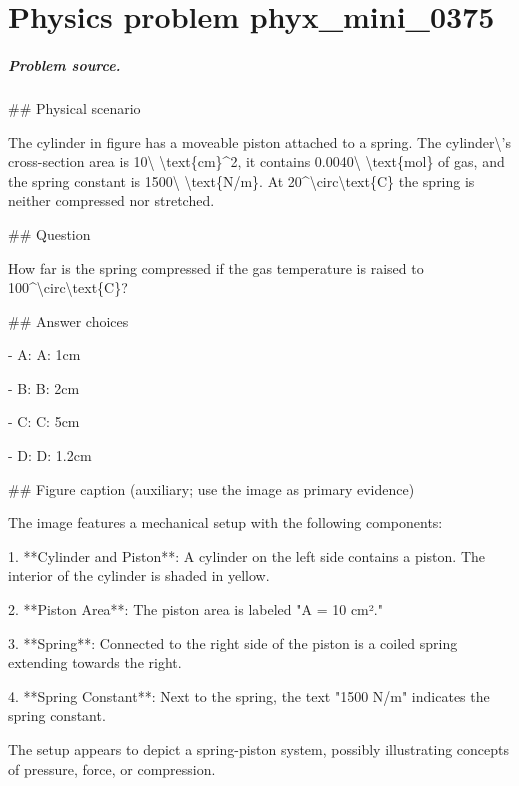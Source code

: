 
\chapter{Physics problem phyx\_mini\_0375}
\label{ch:PhyXMiniProblems_problem_phyx_mini_0375}

\paragraph{Problem source.}
\#\# Physical scenario

The cylinder in figure has a moveable piston attached to a spring. The cylinder\textbackslash{}'s cross-section area is 10\textbackslash{} \textbackslash{}text\{cm\}\textasciicircum{}2, it contains 0.0040\textbackslash{} \textbackslash{}text\{mol\} of gas, and the spring constant is 1500\textbackslash{} \textbackslash{}text\{N/m\}. At 20\textasciicircum{}\textbackslash{}circ\textbackslash{}text\{C\} the spring is neither compressed nor stretched.

\#\# Question

How far is the spring compressed if the gas temperature is raised to 100\textasciicircum{}\textbackslash{}circ\textbackslash{}text\{C\}?

\#\# Answer choices

- A: A: 1cm

- B: B: 2cm

- C: C: 5cm

- D: D: 1.2cm

\#\# Figure caption (auxiliary; use the image as primary evidence)

The image features a mechanical setup with the following components:

1. **Cylinder and Piston**: A cylinder on the left side contains a piston. The interior of the cylinder is shaded in yellow. 

2. **Piston Area**: The piston area is labeled "A = 10 cm²."

3. **Spring**: Connected to the right side of the piston is a coiled spring extending towards the right.

4. **Spring Constant**: Next to the spring, the text "1500 N/m" indicates the spring constant.

The setup appears to depict a spring-piston system, possibly illustrating concepts of pressure, force, or compression.

